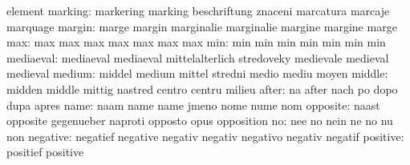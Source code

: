                            element
                  marking: markering                 marking
                           beschriftung              znaceni
                           marcatura                 marcaje
                           marquage
                   margin: marge                     margin
                           marginalie                marginalie
                           margine                   margine
                           marge
                      max: max                       max
                           max                       max
                           max                       max
                           max
                      min: min                       min
                           min                       min
                           min                       min
                           min
                mediaeval: mediaeval                 mediaeval
                           mittelalterlich           stredoveky
                           medievale                 medieval
                           medieval
                   medium: middel                    medium
                           mittel                    stredni
                           medio                     mediu
                           moyen
                   middle: midden                    middle
                           mittig                    nastred
                           centro                    centru
                           milieu
                    after: na                        after
                           nach                      po
                           dopo                      dupa
                           apres
                     name: naam                      name
                           name                      jmeno
                           nome                      nume
                           nom
                 opposite: naast                     opposite
                           gegenueber                naproti
                           opposto                   opus
                           opposition
                       no: nee                       no
                           nein                      ne
                           no                        nu
                           non
                 negative: negatief                  negative
                           negativ                   negativ
                           negativo                  negativ
                           negatif
                 positive: positief                  positive
